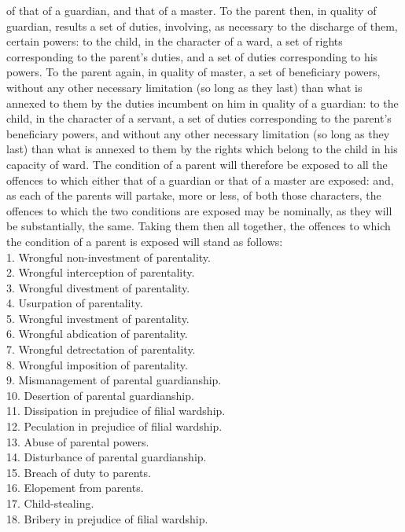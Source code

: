 \documentclass[12pt]{report}
\begin{document}
of that of a guardian, and that of a master. To the parent then, in
quality of guardian, results a set of duties, involving, as necessary to
the discharge of them, certain powers: to the child, in the character of
a ward, a set of rights corresponding to the parent's duties, and a set
of duties corresponding to his powers. To the parent again, in quality
of master, a set of beneficiary powers, without any other necessary
limitation (so long as they last) than what is annexed to them by the
duties incumbent on him in quality of a guardian: to the child, in the
character of a servant, a set of duties corresponding to the parent's
beneficiary powers, and without any other necessary limitation (so long
as they last) than what is annexed to them by the rights which belong to
the child in his capacity of ward. The condition of a parent will
therefore be exposed to all the offences to which either that of a
guardian or that of a master are exposed: and, as each of the parents
will partake, more or less, of both those characters, the offences to
which the two conditions are exposed may be nominally, as they will be
substantially, the same. Taking them then all together, the offences to
which the condition of a parent is exposed will stand as follows:\\
1. Wrongful non-investment of parentality.\\
2. Wrongful interception of parentality.\\
3. Wrongful divestment of parentality.\\
4. Usurpation of parentality.\\
5. Wrongful investment of parentality.\\
6. Wrongful abdication of parentality.\\
7. Wrongful detrectation of parentality.\\
8. Wrongful imposition of parentality.\\
9. Mismanagement of parental guardianship.\\
10. Desertion of parental guardianship.\\
11. Dissipation in prejudice of filial wardship.\\
12. Peculation in prejudice of filial wardship.\\
13. Abuse of parental powers.\\
14. Disturbance of parental guardianship.\\
15. Breach of duty to parents.\\
16. Elopement from parents.\\
17. Child-stealing.\\
18. Bribery in prejudice of filial wardship.
\end{document}
